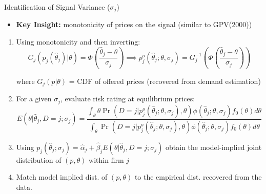 \documentclass[10pt,aspectratio=169]{beamer}
\begin{document}
\begin{frame}{Identification of Signal Variance ($\sigma_j$)}\label{appendix:slide3.1}

\begin{itemize}
  \item \textbf{Key Insight:} monotonicity of prices on the signal (similar to GPV(2000))
\end{itemize}

\begin{enumerate}
  \item Using monotonicity and then inverting: {\small
$$ G_j(p_j(\hat{\theta}_j)|\theta) = \Phi\left(\frac{\hat{\theta}_j - \theta}{\sigma_j}\right) \implies p_j^o(\hat{\theta}_j; \theta, \sigma_j) = G_j^{-1}\left(\Phi\left(\frac{\hat{\theta}_j - \theta}{\sigma_j}\right)\right)$$
}

where $G_j(p|\theta)$ = CDF of offered prices (recovered from demand estimation)

\item For a given $\sigma_j$, evaluate risk rating at equilibrium prices: 
 {\small
$$ E(\theta|\hat{\theta}_j, D=j; \sigma_j) = \frac{\int_\theta \theta \Pr(D=j|p_j^o(\hat{\theta}_j; \theta, \sigma_j), \theta) \phi(\hat{\theta}_j; \theta, \sigma_j) f_0(\theta) d\theta}{\int_\theta \Pr(D=j|p_j^o(\hat{\theta}_j; \theta, \sigma_j), \theta) \phi(\hat{\theta}_j; \theta, \sigma_j) f_0(\theta) d\theta} $$
}

\item Using $p_j(\hat{\theta}_j; \sigma_j) = \hat{\alpha}_j + \hat{\beta}_j E(\theta|\hat{\theta}_j, D=j; \sigma_j)$ obtain the model-implied joint distribution of $(p, \theta)$ within firm $j$ 

\item Match model implied dist. of $(p, \theta)$ to the empirical dist. recovered from the data. 
\end{enumerate}
\end{frame}
\end{document}
